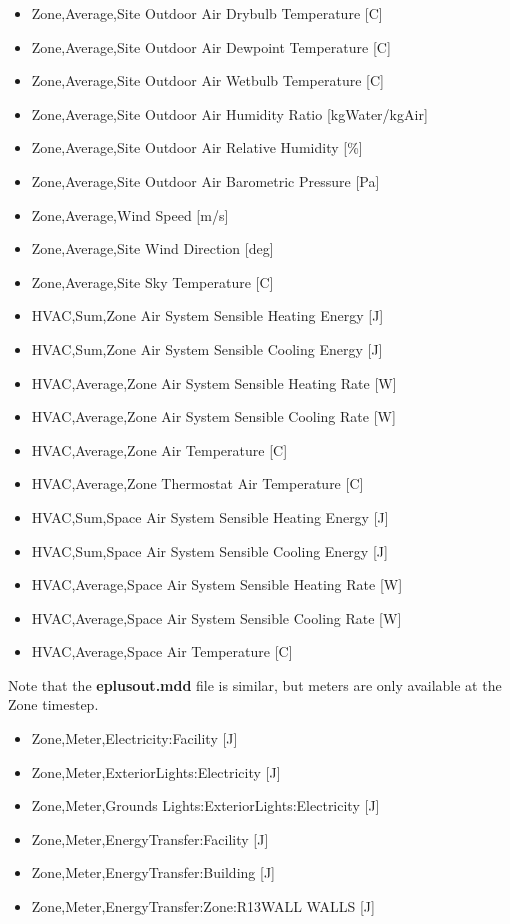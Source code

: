 \begin{itemize}
\item
  Zone,Average,Site Outdoor Air Drybulb Temperature {[}C{]}
\item
  Zone,Average,Site Outdoor Air Dewpoint Temperature {[}C{]}
\item
  Zone,Average,Site Outdoor Air Wetbulb Temperature {[}C{]}
\item
  Zone,Average,Site Outdoor Air Humidity Ratio {[}kgWater/kgAir{]}
\item
  Zone,Average,Site Outdoor Air Relative Humidity {[}\%{]}
\item
  Zone,Average,Site Outdoor Air Barometric Pressure {[}Pa{]}
\item
  Zone,Average,Wind Speed {[}m/s{]}
\item
  Zone,Average,Site Wind Direction {[}deg{]}
\item
  Zone,Average,Site Sky Temperature {[}C{]}
\item
  HVAC,Sum,Zone Air System Sensible Heating Energy {[}J{]}
\item
  HVAC,Sum,Zone Air System Sensible Cooling Energy {[}J{]}
\item
  HVAC,Average,Zone Air System Sensible Heating Rate {[}W{]}
\item
  HVAC,Average,Zone Air System Sensible Cooling Rate {[}W{]}
\item
  HVAC,Average,Zone Air Temperature {[}C{]}
\item
  HVAC,Average,Zone Thermostat Air Temperature {[}C{]}
\item
  HVAC,Sum,Space Air System Sensible Heating Energy {[}J{]}
\item
  HVAC,Sum,Space Air System Sensible Cooling Energy {[}J{]}
\item
  HVAC,Average,Space Air System Sensible Heating Rate {[}W{]}
\item
  HVAC,Average,Space Air System Sensible Cooling Rate {[}W{]}
\item
  HVAC,Average,Space Air Temperature {[}C{]}
\end{itemize}

Note that the \textbf{eplusout.mdd} file is similar, but meters are only available at the Zone timestep.

\begin{itemize}
\item
  Zone,Meter,Electricity:Facility {[}J{]}
\item
  Zone,Meter,ExteriorLights:Electricity {[}J{]}
\item
  Zone,Meter,Grounds Lights:ExteriorLights:Electricity {[}J{]}
\item
  Zone,Meter,EnergyTransfer:Facility {[}J{]}
\item
  Zone,Meter,EnergyTransfer:Building {[}J{]}
\item
  Zone,Meter,EnergyTransfer:Zone:R13WALL WALLS {[}J{]}
\end{itemize}

